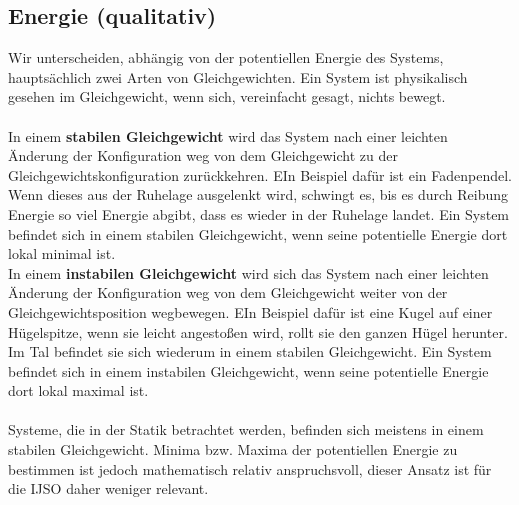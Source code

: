 \documentclass[11pt]{article}
\begin{document}
\subsection{Energie (qualitativ)}
Wir unterscheiden, abhängig von der potentiellen Energie des Systems, hauptsächlich zwei Arten von Gleichgewichten. Ein System ist physikalisch gesehen im Gleichgewicht, wenn sich, vereinfacht gesagt, nichts bewegt. \\\\
In einem \textbf{stabilen Gleichgewicht} wird das System nach einer leichten Änderung der Konfiguration weg von dem Gleichgewicht zu der Gleichgewichtskonfiguration zurückkehren. EIn Beispiel dafür ist ein Fadenpendel. Wenn dieses aus der Ruhelage ausgelenkt wird, schwingt es, bis es durch Reibung Energie so viel Energie abgibt, dass es wieder in der Ruhelage landet. Ein System befindet sich in einem stabilen Gleichgewicht, wenn seine potentielle Energie dort lokal minimal ist. \\
In einem \textbf{instabilen Gleichgewicht} wird sich das System nach einer leichten Änderung der Konfiguration weg von dem Gleichgewicht weiter von der Gleichgewichtsposition wegbewegen. EIn Beispiel dafür ist eine Kugel auf einer Hügelspitze, wenn sie leicht angestoßen wird, rollt sie den ganzen Hügel herunter. Im Tal befindet sie sich wiederum in einem stabilen Gleichgewicht. Ein System befindet sich in einem instabilen Gleichgewicht, wenn seine potentielle Energie dort lokal maximal ist. \\\\
Systeme, die in der Statik betrachtet werden, befinden sich meistens in einem stabilen Gleichgewicht. Minima bzw. Maxima der potentiellen Energie zu bestimmen ist jedoch mathematisch relativ anspruchsvoll, dieser Ansatz ist für die IJSO daher weniger relevant. 
\end{document}
